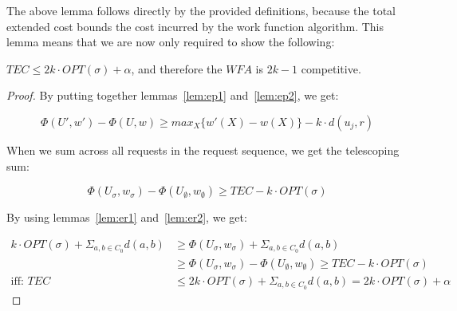 The above lemma follows directly by the provided definitions, because the total extended cost bounds the cost incurred by the work function algorithm. This lemma means that we are now only required to show the following:

\begin{lemma}
    $TEC \leq 2k \cdot  OPT(\sigma) + \alpha$, and therefore the $WFA$ is $2k-1$ competitive.
\end{lemma}

\begin{proof}
    By putting together lemmas~\ref{lem:ep1} and~\ref{lem:ep2}, we get:

    \begin{equation*}
        \Phi(U', w') - \Phi(U, w) \geq max_X\{ w'(X) - w(X)\} -k \cdot  d(u_j, r)
    \end{equation*}

    When we sum across all requests in the request sequence, we get the telescoping sum:

    \begin{equation*}
        \Phi(U_\sigma, w_\sigma) - \Phi(U_\emptyset, w_\emptyset) \geq TEC - k\cdot OPT(\sigma)
    \end{equation*}

    By using lemmas~\ref{lem:er1} and~\ref{lem:er2}, we get:

    \begin{equation*}
        \begin{split}
            k \cdot  OPT(\sigma)+ \Sigma_{a, b \in C_0} d(a, b) &\geq \Phi(U_\sigma, w_\sigma) + \Sigma_{a, b \in C_0} d(a, b) \\
            &\geq \Phi(U_\sigma, w_\sigma) - \Phi(U_\emptyset, w_\emptyset) \geq TEC - k\cdot OPT(\sigma)\\
            \text{iff: }TEC &\leq 2k \cdot  OPT(\sigma) + \Sigma_{a, b \in C_0} d(a, b) = 2k \cdot OPT(\sigma) + \alpha
        \end{split}
    \end{equation*}
\end{proof}




